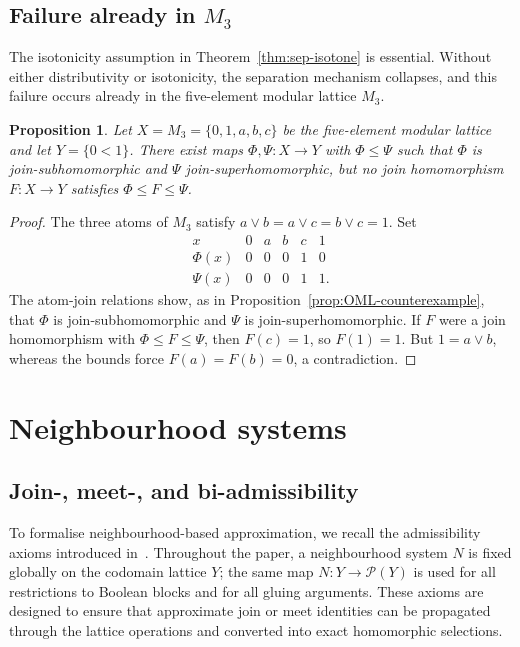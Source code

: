 \documentclass[11pt]{amsart}
\newtheorem{proposition}[theorem]{Proposition}
\theoremstyle{definition}
\newcommand{\join}{\vee}
\newcommand{\Pow}{\mathcal{P}}
\begin{document}
\subsection{Failure already in \texorpdfstring{$M_3$}{M3}}
The isotonicity assumption in Theorem~\ref{thm:sep-isotone} is essential.
Without either distributivity or isotonicity, the separation mechanism collapses,
and this failure occurs already in the five-element modular lattice $M_3$.

\begin{proposition}\label{prop:M3-counterexample}
Let $X=M_3=\{0,1,a,b,c\}$ be the five-element modular lattice and let $Y=\{0<1\}$.
There exist maps $\Phi,\Psi\colon X\to Y$ with $\Phi\le\Psi$ such that $\Phi$ is join-subhomomorphic and $\Psi$ join-superhomomorphic,
but no join homomorphism $F\colon X\to Y$ satisfies $\Phi\le F\le \Psi$.
\end{proposition}

\begin{proof}
The three atoms of $M_3$ satisfy $a\join b=a\join c=b\join c=1$.
Set
\[
\begin{array}{c|ccccc}
x&0&a&b&c&1\\ \hline
\Phi(x)&0&0&0&1&0\\
\Psi(x)&0&0&0&1&1.
\end{array}
\]
The atom-join relations show, as in Proposition~\ref{prop:OML-counterexample}, that $\Phi$ is join-subhomomorphic and $\Psi$ is join-superhomomorphic.
If $F$ were a join homomorphism with $\Phi\le F\le\Psi$, then $F(c)=1$, so $F(1)=1$.
But $1=a\join b$, whereas the bounds force $F(a)=F(b)=0$, a contradiction.
\end{proof}

\section{Neighbourhood systems}

\subsection{Join-, meet-, and bi-admissibility}
To formalise neighbourhood-based approximation, we recall the admissibility axioms
introduced in~\cite{BKP}.
Throughout the paper, a neighbourhood system $N$ is fixed globally on the codomain lattice $Y$; the same map $N\colon Y\to\Pow(Y)$ is used for all restrictions to Boolean blocks and for all gluing arguments.
These axioms are designed to ensure that approximate join or meet identities can be propagated through the lattice operations and converted into exact homomorphic selections.
\end{document}
